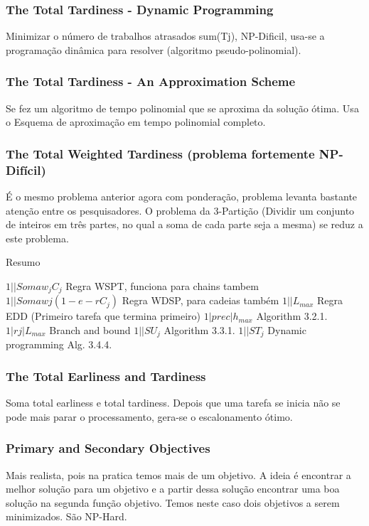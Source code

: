 \subsubsection{The Total Tardiness - Dynamic Programming}

Minimizar o número de trabalhos atrasados sum(Tj), NP-Dificil, usa-se a programação dinâmica para resolver (algoritmo pseudo-polinomial). 

\subsubsection{The Total Tardiness - An Approximation Scheme}
Se fez um algoritmo de tempo polinomial que se aproxima da solução ótima. Usa o Esquema de aproximação em tempo polinomial completo.

\subsubsection{The Total Weighted Tardiness (problema fortemente NP-Difícil)}
É o mesmo problema anterior agora com ponderação, problema levanta bastante atenção entre os pesquisadores. O problema da 3-Partição (Dividir um conjunto de inteiros em três partes, no qual a soma de cada parte seja a mesma) se reduz a este problema.

Resumo 

$1||Soma w_jC_j$	Regra WSPT, funciona para chains tambem
$1||Soma wj(1-e-rC_j)$	Regra WDSP, para cadeias também
$1||L_{max}$	Regra EDD (Primeiro tarefa que termina primeiro)
$1|prec| h_{max}$	Algorithm 3.2.1.
$1|rj|L_{max}$	Branch and bound
$1||S U_j$	Algorithm 3.3.1.
$1||S T_j$	Dynamic programming Alg. 3.4.4.
\\
\subsubsection{The Total Earliness and Tardiness}
Soma total earliness e total tardiness. Depois que uma tarefa se inicia não se pode mais parar o processamento, gera-se o escalonamento ótimo.
\\
\subsubsection{Primary and Secondary Objectives}
Mais realista, pois na pratica temos mais de um objetivo. A ideia é encontrar a melhor solução para um objetivo e a partir dessa solução encontrar uma boa solução na segunda função objetivo. Temos neste caso dois objetivos a serem minimizados. São NP-Hard.
\\

